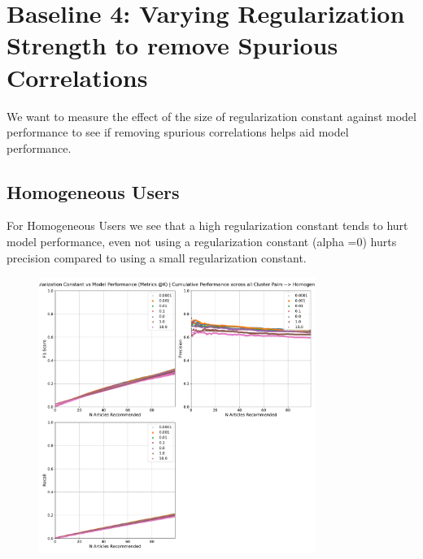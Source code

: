 \documentclass[a4paper,fontsize=9.0pt]{scrartcl}
\begin{document}
\section{Baseline 4: Varying Regularization Strength to remove Spurious Correlations}
\begin{flushleft}
We want to measure the effect of the size of regularization constant against model performance to see if removing spurious correlations helps aid model performance.

\subsection{Homogeneous Users}
\begin{flushleft}
For Homogeneous Users we see that a high regularization constant tends to hurt model performance, even not using a regularization constant (alpha =0) hurts precision compared to using a small regularization constant.
\end{flushleft}
\end{flushleft}
\vspace{-5ex}
\begin{figure}[H]
 \includegraphics[width=0.8\textwidth]{Graphs/regularization_vs_model_performance_cumu_Homogeneous.pdf}
\end{figure}
\end{document}
